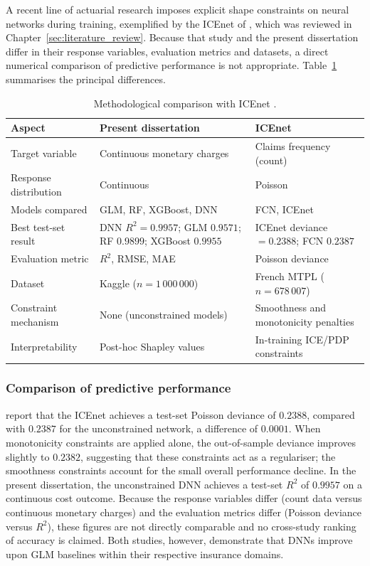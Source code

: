 A recent line of actuarial research imposes explicit shape constraints
on neural networks during training, exemplified by the ICEnet of
\citet{richman2024icenet}, which was reviewed in
Chapter~\ref{sec:literature_review}.  Because that study and the
present dissertation differ in their
response variables, evaluation metrics and datasets, a direct numerical
comparison of predictive performance is not appropriate.
Table~\ref{tab:comparison_icenet} summarises the principal differences.

\begin{table}[H]
\centering
\caption{Methodological comparison with ICEnet \citep{richman2024icenet}.}
\label{tab:comparison_icenet}
\small
\renewcommand{\arraystretch}{1.20}
\begin{tabular}{p{}p{}p{}}
\toprule
\textbf{Aspect} & \textbf{Present dissertation} &
\textbf{ICEnet} \\
\midrule
Target variable
    & Continuous monetary charges
    & Claims frequency (count) \\
Response distribution
    & Continuous
    & Poisson \\
Models compared
    & GLM, RF, XGBoost, DNN
    & FCN, ICEnet \\
Best test-set result
    & DNN $R^2 = 0.9957$; GLM $0.9571$;
      RF $0.9899$; XGBoost $0.9955$
    & ICEnet deviance $= 0.2388$;
      FCN $0.2387$ \\
Evaluation metric
    & \ensuremath{R^2}, RMSE, MAE
    & Poisson deviance \\
Dataset
    & Kaggle \citep{kaggleInsuranceDataML} ($n = 1\,000\,000$)
    & French MTPL ($n = 678\,007$) \\
Constraint mechanism
    & None (unconstrained models)
    & Smoothness and monotonicity penalties \\
Interpretability
    & Post-hoc Shapley values
    & In-training ICE/PDP constraints \\
\bottomrule
\end{tabular}
\end{table}

\subsubsection{Comparison of predictive performance}
\citet{richman2024icenet} report that the ICEnet achieves a test-set
Poisson deviance of $0.2388$, compared with $0.2387$ for the
unconstrained network, a difference of $0.0001$.  When monotonicity
constraints are applied alone, the out-of-sample deviance improves
slightly to $0.2382$, suggesting that these constraints act as a
regulariser; the smoothness constraints account for the small overall
performance decline.  In the present dissertation, the unconstrained DNN
achieves a test-set \ensuremath{R^2} of $0.9957$ on a continuous cost outcome.
Because the response variables differ (count data versus continuous
monetary charges) and the evaluation metrics differ (Poisson deviance
versus \ensuremath{R^2}), these figures are not directly comparable and no
cross-study ranking of accuracy is claimed.  Both studies, however,
demonstrate that DNNs improve upon GLM baselines within
their respective insurance domains.

